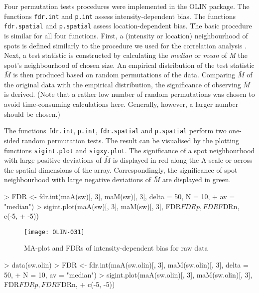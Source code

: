 \documentclass[a4paper,11pt]{article}
\begin{document}
Four permutation tests procedures were implemented in the OLIN package. 
The functions \texttt{fdr.int} and \texttt{p.int} assess intensity-dependent
bias. The functions \texttt{fdr.spatial} and \texttt{p.spatial} assess location-dependent
bias. The basic procedure is similar for all four functions.
First, a (intensity or location)  neighbourhood of spots is defined similarly to the procedure
we used for the correlation analysis .  Next, a test statistic is constructed by calculating
 the \emph{median} or \emph{mean} of \emph{M} the  spot's  neighbourhood of chosen size.
 An empirical distribution of the test statistic $\bar{M}$ is 
then produced  based on random permutations of the
data. Comparing  $\bar{M}$ of the original data with the empirical distribution, the significance 
of observing  $\bar{M}$ is derived. (Note that a rather low number of random permutations was chosen
to avoid time-consuming calculations here. Generally, however, a larger number should be chosen.)  


The functions \texttt{fdr.int}, \texttt{p.int}, \texttt{fdr.spatial} and  \texttt{p.spatial}
perform two one-sided random permutation tests. The result can be visualised by 
the plotting functions \texttt{sigint.plot} and \texttt{sigxy.plot}. 
The significance of a spot neighbourhood with large positive deviations of $\bar{M}$ is 
displayed in red along the A-scale or across the spatial dimensions of the array. 
Correspondingly, the significance of spot neighbourhood with large negative 
deviations of  $\bar{M}$ are displayed in green.  


\begin{Schunk}
\begin{Sinput}
> FDR <- fdr.int(maA(sw)[, 3], maM(sw)[, 3], delta = 50, N = 10, 
+     av = "median")
> sigint.plot(maA(sw)[, 3], maM(sw)[, 3], FDR$FDRp, FDR$FDRn, c(-5, 
+     -5))
\end{Sinput}
\end{Schunk}



\begin{figure}
\centering
\texttt{[image: OLIN-031]}
\caption{MA-plot and FDRs of  intensity-dependent bias for raw data }
\label{fdrintraw}
\end{figure}



\begin{Schunk}
\begin{Sinput}
> data(sw.olin)
> FDR <- fdr.int(maA(sw.olin)[, 3], maM(sw.olin)[, 3], delta = 50, 
+     N = 10, av = "median")
> sigint.plot(maA(sw.olin)[, 3], maM(sw.olin)[, 3], FDR$FDRp, FDR$FDRn, 
+     c(-5, -5))
\end{Sinput}
\end{Schunk}
\end{document}
